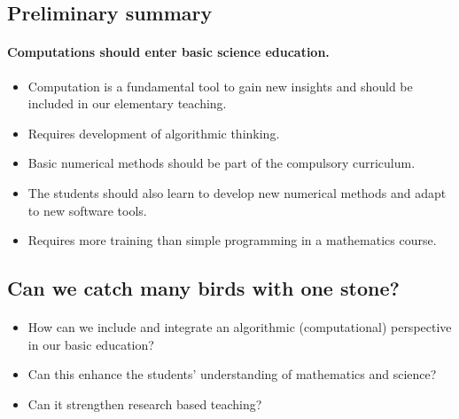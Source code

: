 \documentclass[%
twoside,                 %
final,                   %
10pt]{article}
\begin{document}
\subsection*{Preliminary summary}

\paragraph{Computations should enter basic science education.}

\begin{itemize}
\item Computation is a fundamental tool to gain new insights and should be included in our elementary teaching.

\item Requires development of algorithmic thinking.

\item Basic numerical methods should be part of the compulsory curriculum.

\item The students should also learn to develop new numerical methods and adapt to new software tools.

\item Requires more training than simple programming in a mathematics course.
\end{itemize}

\noindent




\subsection*{Can we catch many birds with one stone?}

\paragraph{}
\begin{itemize}
\item How can we include and integrate an algorithmic (computational) perspective   in our basic education?

\item Can this enhance the students' understanding of mathematics and science?

\item Can it strengthen research based teaching?
\end{itemize}
\end{document}
